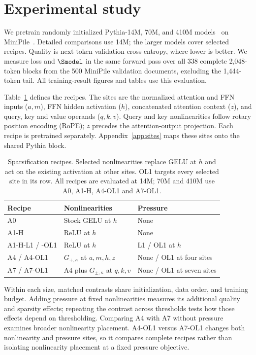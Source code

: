 \section{Experimental study}
\label{sec:experiments}

We pretrain randomly initialized Pythia-14M, 70M, and 410M
models~\citep{biderman2023pythia} on MiniPile~\citep{kaddour2023minipile}.
Detailed comparisons use 14M; the larger models cover selected recipes.
Quality is next-token validation cross-entropy, where lower is better.
We measure loss and $\Smodel$ in the same forward pass over all 338 complete
2,048-token blocks from the 500 MiniPile validation documents, excluding the
1,444-token tail. All training-result figures and tables use this evaluation.

Table~\ref{tab:recipes} defines the recipes. The sites are the normalized
attention and FFN inputs ($a,m$), FFN hidden activation ($h$), concatenated
attention context ($z$), and query, key and value operands ($q,k,v$).
Query and key nonlinearities follow rotary position encoding (RoPE); $z$ precedes
the attention-output projection. Each recipe is pretrained separately.
Appendix~\ref{app:sites} maps these sites onto the shared Pythia block.

\begin{table}[htbp]
\centering\small
\caption{Sparsification recipes. Selected nonlinearities replace GELU at $h$ and act on the
existing activation at other sites. OL1 targets every selected site in its row.
All recipes are evaluated at 14M; 70M and 410M use A0, A1-H, A4-OL1 and A7-OL1.}
\label{tab:recipes}
\begin{tabularx}{\linewidth}{@{}llX@{}}
\toprule
Recipe & Nonlinearities & Pressure \\
\midrule
A0 & Stock GELU at $h$ & None \\
A1-H & ReLU at $h$ & None \\
A1-H-L1 / -OL1 & ReLU at $h$ & L1 / OL1 at $h$ \\
A4 / A4-OL1 & $G_{+,\kappa}$ at $a,m,h,z$ & None / OL1 at four sites \\
A7 / A7-OL1 & A4 plus $G_{\pm,\kappa}$ at $q,k,v$ & None / OL1 at seven sites \\
\bottomrule
\end{tabularx}
\end{table}

Within each size, matched contrasts share initialization, data order, and
training budget. Adding pressure at fixed nonlinearities measures its additional
quality and sparsity effects; repeating the contrast across thresholds tests
how those effects depend on thresholding. Comparing A4 with A7 without
pressure examines broader nonlinearity placement. A4-OL1 versus A7-OL1 changes both
nonlinearity and pressure sites, so it compares complete recipes rather than isolating
nonlinearity placement at a fixed pressure objective.

